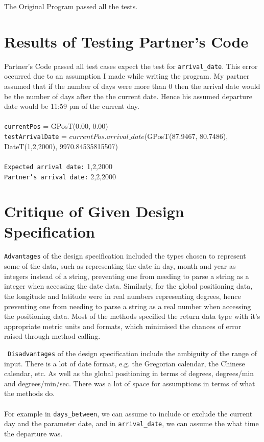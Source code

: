 \documentclass[12pt]{article}
\begin{document}
The Original Program passed all the tests.\\

\section{Results of Testing Partner's Code}

Partner's Code passed all test cases expect the test for \texttt{arrival\_date}. This error occurred due to an assumption I made while writing the program. My partner assumed that if the number of days were more than $0$ then the arrival date would be the number of days after the the current date. Hence his assumed departure date would be 11:59 pm of the current day.\\
\\\texttt{currentPos} = GPosT(0.00, 0.00)\\
\texttt{testArrivalDate} = $currentPos.arrival\_date$(GPosT(87.9467, 80.7486), DateT(1,2,2000), 9970.84535815507)\\
\\\texttt{Expected arrival date:} 1,2,2000\\
\texttt{Partner's arrival date:} 2,2,2000\\

\section{Critique of Given Design Specification}

\texttt{Advantages} of the design specification included the types chosen to represent some of the data, such as representing the date in day, month and year as integers instead of a string, preventing one from needing to parse a string as a integer when accessing the date data. Similarly, for the global positioning data, the longitude and latitude were in real numbers representing degrees, hence preventing one from needing to parse a string as a real number when accessing the positioning data. Most of the methods specified the return data type with it's appropriate metric units and formats, which minimised the chances of error raised through method calling.

~\newline\noindent \texttt{Disadvantages} of the design specification include the ambiguity of the range of input. There is a lot of date format, e.g. the Gregorian calendar, the Chinese calendar, etc. As well as the global positioning in terms of degrees, degrees/min and degrees/min/sec. There was a lot of space for assumptions in terms of what the methods do.
\\\\For example in \texttt{days\_between}, we can assume to include or exclude the current day and the parameter date, and in \texttt{arrival\_date}, we can assume the what time the departure was.
\end{document}
